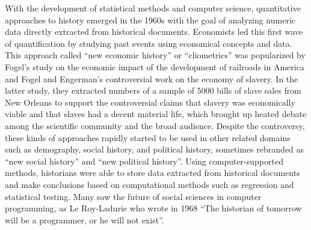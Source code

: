 With the development of statistical methods and computer science, quantitative approaches to history emerged in the 1960s with the goal of analyzing numeric data directly extracted from historical documents.
Economists led this first wave of quantification by studying past events using economical concepts and data.
This approach called ``new economic history'' or ``cliometrics'' was popularized by Fogel's study on the economic impact of the development of railroads in America\cite{fogelRailroadsAmericanEconomic1970} and Fogel and Engerman's controversial work on the economy of slavery\cite{fogel1974time}.
In the latter study, they extracted numbers of a sample of 5000 bills of slave sales from New Orleans to support the controversial claims that slavery was economically viable and that slaves had a decent material life, which brought up heated debate among the scientific community and the broad audience\cite{whaplesWhereThereConsensus1995}.
Despite the controversy, these kinds of approaches rapidly started to be used in other related domains such as demography, social history, and political history, sometimes rebranded as ``new social history'' and ``new political history''\cite{lemercierBackSourcesPracticing2021}.
Using computer-supported methods, historians were able to store data extracted from historical documents and make conclusions based on computational methods such as regression and statistical testing.
Many saw the future of social sciences in computer programming, as Le Roy-Ladurie who wrote in 1968 ``The historian of tomorrow will be a programmer, or he will not exist''\cite{lemercierQuantitativeMethodsHumanities2019}.

